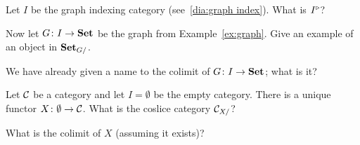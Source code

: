 \documentclass[CT4S-EN-RU]{subfiles}
\begin{document}
\begin{exerciseENG}
Let $I$ be the graph indexing category (see~\ref{dia:graph index}).
\sexc What is $I^\triangleright$?
\item Now let $G\colon I\rightarrow{\mathbf{Set}}$ be the graph from Example~\ref{ex:graph}. Give an example of an object in ${\mathbf{Set}}_{G/}$. 
\item We have already given a name to the colimit of $G\colon I\rightarrow{\mathbf{Set}}$; what is it?
\endsexc
\end{exerciseENG}

\begin{exerciseRUS}
\end{exerciseRUS}

\begin{exerciseENG}\label{exc:initial as colimit}
Let $\mathcal{C}$ be a category and let $I=\emptyset$ be the empty category. There is a unique functor $X\colon\emptyset\rightarrow\mathcal{C}$.
\sexc What is the coslice category $\mathcal{C}_{X/}$?
\item What is the colimit of $X$ (assuming it exists)?
\endsexc
\end{exerciseENG}

\begin{exerciseRUS}\label{exc:initial as colimit}
\end{exerciseRUS}
\end{document}
